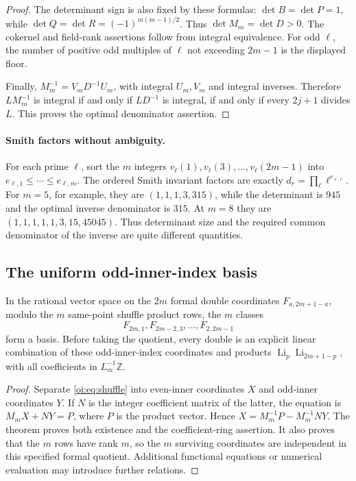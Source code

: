\begin{proof}
The determinant sign is also fixed by these formulas:
$\det B=\det P=1$, while
$\det Q=\det R=(-1)^{m(m-1)/2}$.  Thus $\det M_m=\det D>0$.
The cokernel and field-rank assertions follow from integral equivalence.
For odd $\ell$, the number of positive odd multiples of $\ell$ not
exceeding $2m-1$ is the displayed floor.

Finally, $M_m^{-1}=V_mD^{-1}U_m$, with integral $U_m,V_m$ and integral
inverses.  Therefore $LM_m^{-1}$ is integral if and only if $LD^{-1}$
is integral, if and only if every $2j+1$ divides $L$.  This proves the
optimal denominator assertion.
\end{proof}

\paragraph{Smith factors without ambiguity.}
For each prime $\ell$, sort the $m$ integers
$v_\ell(1),v_\ell(3),\ldots,v_\ell(2m-1)$ into
$e_{\ell,1}\leq\cdots\leq e_{\ell,m}$.  The ordered Smith invariant
factors are exactly
$d_r=\prod_\ell\ell^{e_{\ell,r}}$.  For $m=5$, for example, they are
$(1,1,1,3,315)$, while the determinant is $945$ and the optimal inverse
denominator is $315$.  At $m=8$ they are
$(1,1,1,1,1,3,15,45045)$.  Thus determinant size and the required common
denominator of the inverse are quite different quantities.

\subsection{The uniform odd-inner-index basis}

\begin{corollary}
\label{oi:cor:basket}
In the rational vector space on the $2m$ formal double coordinates
$F_{a,2m+1-a}$, modulo the $m$ same-point shuffle product rows, the $m$
classes
\[
 F_{2m,1},F_{2m-2,3},\ldots,F_{2,2m-1}
\]
form a basis.  Before taking the quotient, every double is an explicit
linear combination of these odd-inner-index coordinates and products
$\operatorname{Li}_p\operatorname{Li}_{2m+1-p}$, with all coefficients
in $L_m^{-1}\mathbb Z$.
\end{corollary}
\begin{proof}
Separate \eqref{oi:eq:shuffle} into even-inner coordinates $X$ and
odd-inner coordinates $Y$.  If $N$ is the integer coefficient matrix
of the latter, the equation is $M_mX+NY=P$, where $P$ is the product
vector.  Hence $X=M_m^{-1}P-M_m^{-1}NY$.  The theorem proves both
existence and the coefficient-ring assertion.  It also proves that the
$m$ rows have rank $m$, so the $m$ surviving coordinates are independent
in this specified formal quotient.  Additional functional equations
or numerical evaluation may introduce further relations.
\end{proof}

